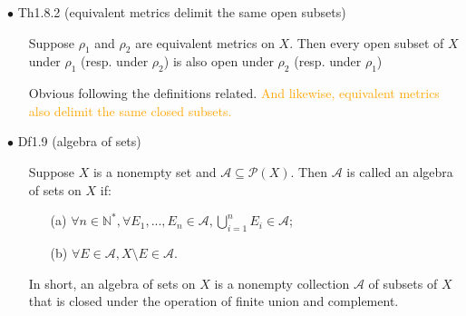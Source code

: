 \documentclass{article}
\begin{document}
{\Large $\bullet $ Th1.8.2 (equivalent metrics delimit the same open subsets)}\par
\begin{itemize}
    \item[]
    {\large Suppose $\rho_1$ and $\rho_2$ are equivalent metrics on $X$. Then every
    open subset of $X$ under $\rho_1$ (resp. under $\rho_2$) 
    is also open under $\rho_2$ (resp. under $\rho_1$)}\par
    {\textcolor{pf}{Obvious following the definitions related.}}
    {\textcolor{orange}{And likewise, equivalent metrics also delimit the same closed subsets.}}
\end{itemize}\par
\quad

{\Large $\bullet $ Df1.9 (algebra of sets)}\par
\begin{itemize}
    \item[]
    {\large Suppose $X$ is a nonempty set and $\mathcal{A} \subseteq \mathcal{P}(X)$. 
    Then $\mathcal{A} $ is called an algebra of sets on $X$ if:
    \begin{enumerate}
        \item[(a)] $\forall n\in \mathbb{N}^{\ast}, \forall E_1,...,E_n \in \mathcal{A},\bigcup_{i=1}^{n}E_i \in \mathcal{A} $;
        \item[(b)] $\forall E\in \mathcal{A} , X\setminus E \in \mathcal{A} $.  
    \end{enumerate}
    }
    {\textcolor{pf}{In short, an algebra of sets on $X$ is a nonempty collection $\mathcal{A}$ of subsets of $X$ that
    is closed under the operation of finite union and complement.}}
\end{itemize}\par
\quad
\end{document}
